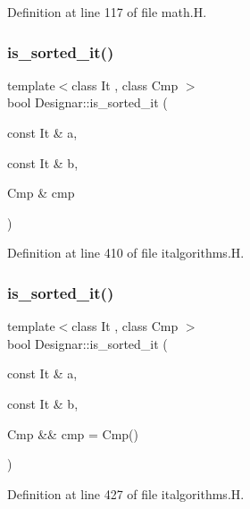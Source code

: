 Definition at line 117 of file math.\+H.

\mbox{\label{namespace_designar_a2f33378e3e21b1dda9bbfa0c5537c174}} 
\subsubsection{\texorpdfstring{is\+\_\+sorted\+\_\+it()}{is\_sorted\_it()}\hspace{0.1cm}{\footnotesize\ttfamily [1/2]}}
{\footnotesize\ttfamily template$<$class It , class Cmp $>$ \\
bool Designar\+::is\+\_\+sorted\+\_\+it (\begin{DoxyParamCaption}\item[{const It \&}]{a,  }\item[{const It \&}]{b,  }\item[{Cmp \&}]{cmp }\end{DoxyParamCaption})}



Definition at line 410 of file italgorithms.\+H.

\mbox{\label{namespace_designar_a201bc6cc5dcc9525bc150e658a81ddbc}} 
\subsubsection{\texorpdfstring{is\+\_\+sorted\+\_\+it()}{is\_sorted\_it()}\hspace{0.1cm}{\footnotesize\ttfamily [2/2]}}
{\footnotesize\ttfamily template$<$class It , class Cmp $>$ \\
bool Designar\+::is\+\_\+sorted\+\_\+it (\begin{DoxyParamCaption}\item[{const It \&}]{a,  }\item[{const It \&}]{b,  }\item[{Cmp \&\&}]{cmp = {\ttfamily Cmp()} }\end{DoxyParamCaption})}



Definition at line 427 of file italgorithms.\+H.

\mbox{\label{namespace_designar_ae26ed0e58d724f576ed6faecb606265b}} 
